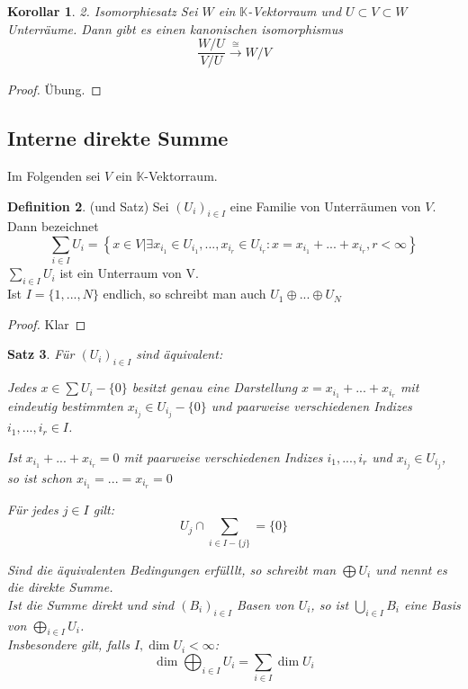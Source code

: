 \documentclass[12pt,a4paper]{article}
\newtheorem{theorem}{Satz}
\newtheorem{corollary}[theorem]{Korollar}
\theoremstyle{definition}
\newtheorem{definition}[theorem]{Definition}
\theoremstyle{remark}
\begin{document}
	\begin{corollary}{2. Isomorphiesatz}
		Sei $W$ ein $\mathbb{K}$-Vektorraum und $U \subset V \subset W$ Unterräume. Dann gibt es einen kanonischen isomorphismus
		\begin{equation}
			\frac{W/U}{V/U} \xrightarrow{\cong} W/V
		\end{equation}
	\end{corollary}
	\begin{proof}
		Übung.
	\end{proof}
	\subsection{Interne direkte Summe}
	Im Folgenden sei $V$ ein $\mathbb{K}$-Vektorraum.
	\begin{definition}{(und Satz)}
		Sei $(U_i)_{i \in I}$ eine Familie von Unterräumen von $V$. Dann bezeichnet
		\begin{equation}
			\sum\limits_{i \in I} U_i = \left\{ x \in V | \exists x_{i_1} \in U_{i_1},...,x_{i_r} \in U_{i_r}: x= x_{i_1}+...+x_{i_r}, r < \infty \right\}
		\end{equation}
		$\sum_{i \in I} U_i$ ist ein Unterraum von V. \\
		Ist $I = \{ 1,...,N \}$ endlich, so schreibt man auch $U_1 \oplus ... \oplus U_N$
	\end{definition}
	\begin{proof}
		Klar
	\end{proof}
	\begin{theorem}
		Für $(U_i)_{i \in I}$ sind äquivalent:
		\begin{proofenum}
			\item Jedes $x \in \sum U_i - \{ 0\}$ besitzt genau eine Darstellung $x = x_{i_1}+...+x_{i_r}$ mit eindeutig bestimmten $x_{i_j} \in U_{i_j} - \{ 0 \}$ und paarweise verschiedenen Indizes $i_1,...,i_r \in I$.
			\item
				Ist $x_{i_1}+...+x_{i_r}=0$ mit paarweise verschiedenen Indizes $i_1,...,i_r$ und $x_{i_j} \in U_{i_j}$, so ist schon $x_{i_1}=...=x_{i_r}=0$
			\item
				Für jedes $j \in I$ gilt:
				\begin{equation}
					U_j \cap \sum_{i \in I-\{ j\}}= \{0 \}
				\end{equation}
		\end{proofenum}
		Sind die äquivalenten Bedingungen erfülllt, so schreibt man $\bigoplus U_i$ und nennt es die direkte Summe. \\
		Ist die Summe direkt und sind $(B_i)_{i \in I}$ Basen von $U_i$, so ist $\bigcup_{i \in I} B_i$ eine Basis von $\bigoplus_{i \in I} U_i$. \\
		Insbesondere gilt, falls $I, \dim U_i < \infty$:
		\begin{equation}
			\dim \bigoplus_{i \in I} U_i = \sum_{i \in I} \dim U_i
		\end{equation}
	\end{theorem}
\end{document}
